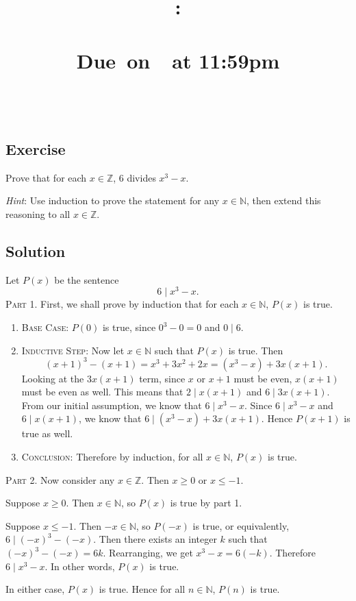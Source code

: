\documentclass{article}
\title{
    \vspace{2in}
    \textbf{\hmwkClass:\\ \hmwkTitle}\\
    \normalsize\vspace{0.1in}\small{Due\ on\ \hmwkDueDate\ at 11:59pm}\\
    \vspace{0.1in}\large{\textit{\hmwkClassInstructor\ \hmwkSection}}
    \vspace{3in}
    \author{\textbf{\hmwkAuthorName}}
    \date{}
}
\newcounter{counter}
\newcommand{\Exercise}{Exercise \stepcounter{counter}\thecounter}
\begin{document}
\maketitle
\pagebreak

\subsection*{\Exercise}
    Prove that for each $x \in \mathbb{Z}$, 6 divides $x^3 - x$.
    
    \vspace{1.5mm}
    {\small \textit{Hint}: Use induction to prove the statement for any $x \in \mathbb{N}$, then extend this reasoning to all $x \in \mathbb{Z}$.}


\subsection*{Solution}
    Let $P(x)$ be the sentence $$6 \mid x^3 - x.$$
    \textsc{Part 1.} First, we shall prove by induction that for each $x \in \mathbb{N}$, $P(x)$ is true.
    \begin{enumerate} [label = {}, nosep, leftmargin = .25in]
        \item \textsc{Base Case}: $P(0)$ is true, since $0^3 - 0 = 0$ and $0 \mid 6$.
        \item \textsc{Inductive Step}: Now let $x \in \mathbb{N}$ such that $P(x)$ is true. Then 
        $$(x + 1)^3 - (x + 1) = x^3 + 3x^2 + 2x = (x^3 - x) + 3x(x + 1).$$
        Looking at the $3x(x + 1)$ term, since $x$ or $x + 1$ must be even, $x(x + 1)$ must be even as well. This means that $2 \mid x(x + 1)$ and $6 \mid 3x(x + 1)$. From our initial assumption, we know that $6 \mid x^3 - x$. Since $6 \mid x^3 - x$ and $6 \mid x(x + 1)$, we know that $6 \mid (x^3 - x) + 3x(x + 1)$. Hence $P(x + 1)$ is true as well.
        \item \textsc{Conclusion}: Therefore by induction, for all $x \in \mathbb{N}$, $P(x)$ is true.
    \end{enumerate}
    
    \vspace{1.5mm}
    \textsc{Part 2.} Now consider any $x \in \mathbb{Z}$. Then $x \ge 0$ or $x \le -1$. 
    
    \begin{Cases}
        \item Suppose $x \ge 0$. Then $x \in \mathbb{N}$, so $P(x)$ is true by part 1. 
        \item Suppose $x \le -1$. Then $-x \in \mathbb{N}$, so $P(-x)$ is true, or equivalently, $6 \mid (-x)^3 - (-x)$. Then there exists an integer $k$ such that $(-x)^3 - (-x) = 6k$. Rearranging, we get $x^3 - x = 6(-k)$. Therefore $6 \mid x^3 - x$. In other words, $P(x)$ is true.
    \end{Cases}
    In either case, $P(x)$ is true. Hence for all $n \in \mathbb{N}$, $P(n)$ is true.
\end{document}
